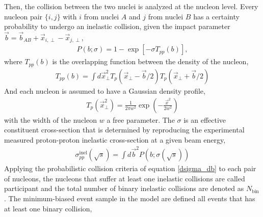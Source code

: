 Then, the collision between the two nuclei is analyzed at the nucleon level. 
Every nucleon pair $\{i, j\}$ with $i$ from nuclei $A$ and $j$ from nuclei $B$ has a certainty probability to undergo an inelastic collision, given the impact parameter $\vec{b} = \vec{b}_{AB} + \vec{x}_{i, \perp} -  \vec{x}_{j, \perp}$,
\begin{eqnarray}
P(b; \sigma) = 1 - \exp\left[-\sigma T_{pp}(b)\right],
\label{dsigma_db}
\end{eqnarray}
where $T_{pp}(b)$ is the overlapping function between the density of the nucleon,
\begin{eqnarray}
T_{pp}(b) = \int d\vec{x}_\perp^2 T_p(\vec{x}_\perp-\vec{b}/2) T_p(\vec{x}_\perp+\vec{b}/2)
\end{eqnarray}
And each nucleon is assumed to have a Gaussian density profile, 
\begin{eqnarray}
T_p(\vec{x}_\perp^2) = \frac{1}{2\pi w^2} \exp\left(-\frac{\vec{x}^2}{2w^2}\right)
\end{eqnarray}
with the width of the nucleon $w$ a free parameter.
The $\sigma$ is an effective constituent cross-section that is determined by reproducing the experimental measured proton-proton inelastic cross-section at a given beam energy,
\begin{eqnarray}
\sigma_{pp}^\text{inel}(\sqrt{s}) = \int d\vec{b}^2 P(b; \sigma(\sqrt{s}))
\end{eqnarray}
Applying the probabilistic collision criteria of equation \ref{dsigma_db} to each pair of nucleons, the nucleons that suffer at least one inelastic collisions are called participant and the total number of binary inelastic collisions are denoted as $N_{\textrm{bin}}$.
The minimum-biased event sample in the \trento model are defined all events that has at least one binary collision, 

